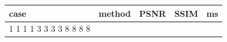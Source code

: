 \begin{tabular}{llrrr}
\toprule
case & method & PSNR & SSIM & ms \\
\midrule
1%
1%
1%
1%
3%
3%
3%
3%
8%
8%
8%
8%
\bottomrule
\end{tabular}

